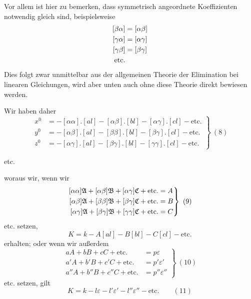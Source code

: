 Vor allem ist hier zu bemerken, dass symmetrisch angeordnete Koeffizienten notwendig gleich sind, beispielsweise
\[
\begin{aligned}\relax
[\beta\alpha]&=[\alpha\beta]\\
[\gamma\alpha]&=[\alpha\gamma]\\
[\gamma\beta]&=[\beta\gamma]\\
\text{etc.}&
\end{aligned}
\]
Dies folgt zwar unmittelbar aus der allgemeinen Theorie der Elimination bei linearen Gleichungen, wird aber unten auch ohne diese Theorie direkt bewiesen werden.

Wir haben daher
\[
\left.\begin{aligned}
x^0&=-[\alpha\alpha].[al]-[\alpha\beta].[bl]-[\alpha\gamma].[cl]-\text{etc.}\\
y^0&=-[\alpha\beta].[al]-[\beta\beta].[bl]-[\beta\gamma].[cl]-\text{etc.}\\
z^0&=-[\alpha\gamma].[al]-[\beta\gamma].[bl]-[\gamma\gamma].[cl]-\text{etc.}
\end{aligned}\right\}\ (8)
\]
\begin{center}etc.\end{center}
woraus wir, wenn wir
\[
\left.\begin{aligned}\relax
[\alpha\alpha]\mathfrak A+[\alpha\beta]\mathfrak B+[\alpha\gamma]\mathfrak C+\text{etc.}&=A\\
[\alpha\beta]\mathfrak A+[\beta\beta]\mathfrak B+[\beta\gamma]\mathfrak C+\text{etc.}&=B\\
[\alpha\gamma]\mathfrak A+[\beta\gamma]\mathfrak B+[\gamma\gamma]\mathfrak C+\text{etc.}&=C
\end{aligned}\right\}\ (9)
\]
etc. setzen,
\[
K=k-A[al]-B[bl]-C[cl]-\text{etc.}
\]
erhalten; oder wenn wir außerdem
\[
\left.\begin{aligned}
aA+bB+cC+\text{etc.}&=p\varepsilon\\
a'A+b'B+c'C+\text{etc.}&=p'\varepsilon'\\
a''A+b''B+c''C+\text{etc.}&=p''\varepsilon''
\end{aligned}\right\}\ (10)
\]
etc. setzen, gilt
\[
K=k-l\varepsilon-l'\varepsilon'-l''\varepsilon''-\text{etc.}\qquad(11)
\]
\clearpage

